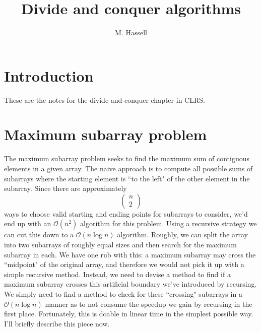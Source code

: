 \documentclass[12pt,english]{article}
\title{Divide and conquer algorithms}
\author{M. Hassell}
\begin{document}
\maketitle

\section{Introduction}

These are the notes for the divide and conquer chapter in CLRS.

\section{Maximum subarray problem}

The maximum subarray problem seeks to find the maximum sum of contiguous elements in a given array.  The naive approach is to compute all possible sums of subarrays where the starting element is ``to the left" of the other element in the subarray.  Since there are approximately 
$$
\left(
\begin{array}{c}
n \\
2
\end{array}
\right)
$$ 
ways to choose valid starting and ending points for subarrays to consider, we'd end up with an $\mathcal{O}(n^2)$ algorithm for this problem.  Using a recursive strategy we can cut this down to a $\mathcal{O}( n \log n)$ algorithm.  Roughly, we can split the array into two subarrays of roughly equal sizes and then search for the maximum subarray in each.  We have one rub with this: a maximum subarray may cross the ``midpoint" of the original array, and therefore we would not pick it up with a simple recursive method.  Instead, we need to devise a method to find if a maximum subarray crosses this artificial boundary we've introduced by recursing.   We simply need to find a method to check for these ``crossing" subarrays in a $\mathcal{O}(n \log n)$ manner as to not consume the speedup we gain by recursing in the first place.  Fortunately, this is doable in linear time in the simplest possible way.  I'll briefly describe this piece now.\\
\end{document}
